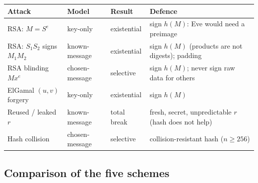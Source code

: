 \begin{center}\small
\begin{tabularx}{\textwidth}{@{}l l l X@{}}
\toprule
Attack & Model & Result & Defence\\
\midrule
RSA: $M = S^e$ & key-only & existential & sign $h(M)$: Eve would need a preimage\\
RSA: $S_1 S_2$ signs $M_1 M_2$ & known-message & existential & sign $h(M)$ (products are not digests); padding\\
RSA blinding $M x^e$ & chosen-message & selective & sign $h(M)$; never sign raw data for others\\
ElGamal $(u, v)$ forgery & key-only & existential & sign $h(M)$\\
Reused / leaked $r$ & known-message & total break & fresh, secret, unpredictable $r$ (hash does not help)\\
Hash collision & chosen-message & selective & collision-resistant hash ($n \ge 256$)\\
\bottomrule
\end{tabularx}
\end{center}

\subsection{Comparison of the five schemes}

